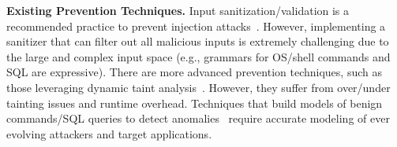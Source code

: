 \noindent
{\bf Existing Prevention Techniques.}
Input sanitization/validation is a recommended practice to prevent  injection attacks~\cite{Alkhalaf2014AutomaticDA, webssari, saner_2008}. However, implementing a sanitizer that can filter out all malicious inputs is extremely challenging due to the large and complex input space (e.g., grammars for OS/shell commands and SQL are expressive). 
%
%
There are more advanced prevention techniques, such as those leveraging dynamic taint analysis~\cite{nguyen-tuong-sql,  Haldar_2005, chin_2009, csse, sqlcheck, halfond06fse}. However, they suffer from over/under tainting issues and runtime overhead.
Techniques that build models of benign commands/SQL queries to detect anomalies~\cite{sekar_ndss,  AMNESIA, CANDID} require accurate modeling of ever evolving attackers and target applications. %


